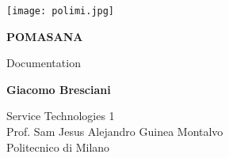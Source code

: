 \begin{titlepage}
	
    \begin{center}
    
		\texttt{[image: polimi.jpg]}

        \vspace*{3cm}
        
        
        \Huge
        \textbf{POMASANA}
        
        \vspace{0.5cm}
        \LARGE
        Documentation
        
        \vspace{1.5cm}
        
        \textbf{Giacomo Bresciani}
        
        \vfill
        
        
        \vspace{0.8cm}
        
        
        \Large
        Service Technologies 1\\
        Prof. Sam Jesus Alejandro Guinea Montalvo\\
        Politecnico di Milano\\

        
        
    \end{center}
\end{titlepage}
